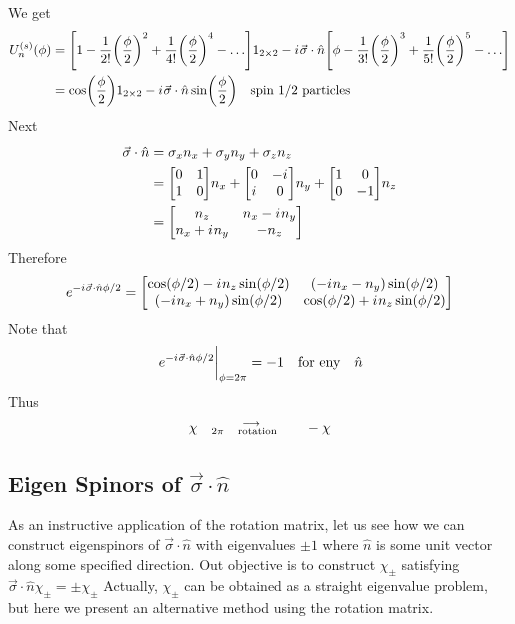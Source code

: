 We get
\begin{align}
U_n^{(s)}\qty(\phi) 
&= \qty[1 - \frac{1}{2!} \qty(\frac{\phi}{2})^2 + \frac{1}{4 !} \qty(\frac{\phi}{2})^4 - \ldots] 1_{2\times 2}
- \iu \vec{\sigma} \cdot \hat{n} \qty[\phi - \frac{1}{3 !} \qty(\frac{\phi}{2})^3 + \frac{1}{5 !} \qty(\frac{\phi}{2})^5 - \ldots] \nonumber\\
&= \cos(\frac{\phi}{2}) 1_{2\times 2} - \iu \vec{\sigma} \cdot \hat{n} \sin(\frac{\phi}{2}) \qq{spin 1/2 particles}
\end{align}
Next
\begin{align*}
\vec{\sigma} \cdot \hat{n} 
&= \sigma_x n_x + \sigma_y n_y + \sigma_z n_z \\
&= \mqty[0 & 1 \\ 1 & 0] n_x + \mqty[0 & -\iu \\ \iu & 0] n_y + \mqty[1 & 0 \\ 0 & -1] n_z \\
&= \mqty[n_z & n_x - \iu n_y \\ n_x + \iu n_y & -n_z]
\end{align*}
Therefore
\begin{equation}
e^{-\iu \vec{\sigma} \cdot \hat{n} \phi/2} = \mqty[\cos(\phi/2) - \iu n_z \sin(\phi/2) & \qty(- \iu n_x - n_y) \sin(\phi/2) \\
\qty(-\iu n_x + n_y) \sin(\phi/2) & \cos(\phi/2) + \iu n_z \sin(\phi/2)]
\end{equation}
Note that
\begin{equation}
\eval{e^{-\iu \vec{\sigma}\cdot \hat{n}\phi/2}}_{\phi=2 \pi} = -1 \qq{for eny} \hat{n}
\end{equation}
Thus
\begin{align}
\chi \quad \substack{\longrightarrow \\ 2\pi \qq{rotation}} \quad - \chi
\end{align}



\subsection{Eigen Spinors of $\vec{\sigma} \cdot \hat{n}$}
As an instructive application of the rotation matrix, let us see how we can construct eigenspinors of $\vec{\sigma}\cdot \hat{n}$ with eigenvalues $\pm 1$ where $\hat{n}$ is some unit vector along some specified direction. Out objective is to construct $\chi_{\pm}$ satisfying $\vec{\sigma} \cdot \hat{n} \chi_{\pm} = \pm \chi_{\pm}$
Actually, $\chi_{\pm}$ can be obtained as a  straight eigenvalue problem, but here we present an alternative method using the rotation matrix.\\


